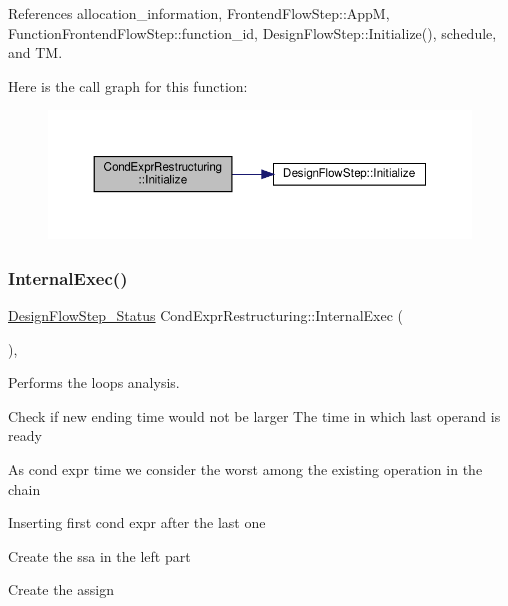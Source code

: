 References allocation\+\_\+information, Frontend\+Flow\+Step\+::\+AppM, Function\+Frontend\+Flow\+Step\+::function\+\_\+id, Design\+Flow\+Step\+::\+Initialize(), schedule, and TM.

Here is the call graph for this function\+:
\nopagebreak
\begin{figure}[H]
\begin{center}
\leavevmode
\includegraphics[width=350pt]{dd/d33/classCondExprRestructuring_a5ac68a27de704107d9e33b3a93751a73_cgraph}
\end{center}
\end{figure}
\mbox{\label{classCondExprRestructuring_aae99125cadd764e66ff2566f4942ecb2}} 
\subsubsection{\texorpdfstring{Internal\+Exec()}{InternalExec()}}
{\footnotesize\ttfamily \hyperlink{design__flow__step_8hpp_afb1f0d73069c26076b8d31dbc8ebecdf}{Design\+Flow\+Step\+\_\+\+Status} Cond\+Expr\+Restructuring\+::\+Internal\+Exec (\begin{DoxyParamCaption}{ }\end{DoxyParamCaption})\hspace{0.3cm}{\ttfamily [override]}, {\ttfamily [virtual]}}



Performs the loops analysis. 

Check if new ending time would not be larger The time in which last operand is ready

As cond expr time we consider the worst among the existing operation in the chain

Inserting first cond expr after the last one

Create the ssa in the left part

Create the assign

